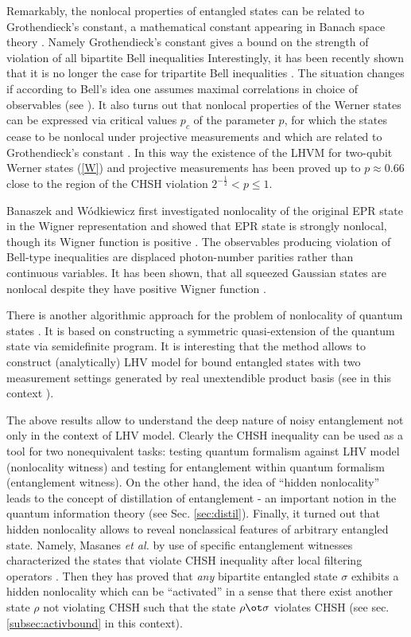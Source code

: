 \documentclass[rmp,12pt,preprint]{revtex4-2}
\begin{document}
Remarkably, the nonlocal properties of entangled states can be
related to  Grothendieck's constant, a mathematical constant
appearing in Banach space theory \cite{Grothendieck_const}.
Namely Grothendieck's constant gives a bound on the strength of violation
of all bipartite Bell inequalities \cite{Tsirelson,AcinGT2006-grot}
Interestingly, it has been recently shown that it is no longer the case for
tripartite Bell inequalities \cite{GraziaWVJ_unbound_violBell_2007}. The situation
changes if according to Bell's idea one assumes maximal correlations in choice
of observables (see \cite{Pitowsky2007}).
It also turns out that nonlocal properties of the Werner states can be expressed
via critical values $p_c$ of the parameter $p$, for which the states
cease to be nonlocal under projective measurements and which are
related to Grothendieck's constant \cite {AcinGT2006-grot}. In this way the
existence of the LHVM for two-qubit Werner states (\ref{W}) and
projective measurements has been proved up to $p\approx 0.66$ close
to the region of the CHSH violation $2^{-\frac{1}{2}} < p \leq 1$.

Banaszek and W\'{o}dkiewicz first investigated nonlocality of the
original EPR state in the Wigner representation and showed that EPR
state is strongly nonlocal, though its Wigner function is positive
\cite {BanaszekW}. The observables producing violation of Bell-type
inequalities are displaced photon-number parities rather than
continuous variables. It has been shown, that all squeezed Gaussian
states are nonlocal despite they have positive Wigner function
\cite{LoockB2001}.

There is another algorithmic approach for the problem of nonlocality
of quantum states \cite {TerhalDS}. It is based on constructing a
symmetric quasi-extension of the quantum state via semidefinite
program. It is interesting that the method allows to construct
(analytically) LHV model for bound entangled states with two measurement
settings generated by real unextendible product basis (see in this
context \cite {KaszlikowskiZG}).


The above results allow to understand the deep nature of noisy
entanglement not only in the context of LHV model. Clearly the CHSH
inequality can be used as a tool for two nonequivalent tasks: testing
quantum formalism against LHV model (nonlocality witness) and testing for entanglement within
quantum formalism (entanglement witness). On the other hand, the idea of ``hidden
nonlocality'' leads to the concept of distillation of entanglement -
an important notion in the quantum information theory (see
Sec. \ref{sec:distil}). Finally, it turned out that hidden nonlocality
allows to reveal nonclassical  features of arbitrary entangled  state.
Namely,  Masanes {\it et al.} by use of specific entanglement witnesses characterized the states that violate CHSH inequality after local filtering operators \cite{MasanesLD2007}. Then they has proved that {\it any} bipartite entangled state $\sigma$  exhibits a hidden nonlocality which can be ``activated'' in a sense that there exist another state $\rho$ not violating CHSH such that the state $\rho \ot \sigma$ violates CHSH (see sec. \ref{subsec:activbound} in this context).
\end{document}

